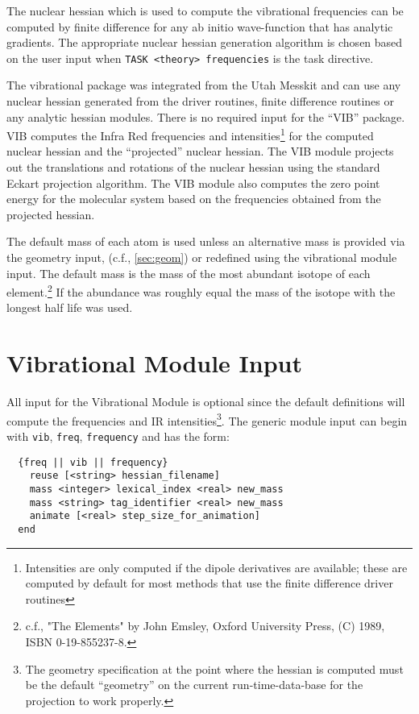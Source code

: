 \label{sec:vib}

The nuclear hessian which is used to compute the vibrational
frequencies can be computed by finite difference for any ab initio
wave-function that has analytic gradients.  The appropriate
nuclear hessian generation algorithm is chosen based on the user input
when \verb+TASK <theory> frequencies+ is the task directive.

The vibrational package was integrated from the Utah Messkit and can
use any nuclear hessian generated from the driver routines, finite
difference routines or any analytic hessian modules.  There is no required
input for the ``VIB'' package.  VIB computes the Infra Red frequencies
and intensities\footnote{Intensities are only computed if the dipole
derivatives are available; these are computed by default for most
methods that use the finite difference driver routines} for the
computed nuclear hessian and the ``projected'' nuclear hessian.  The
VIB module projects out the translations and rotations of the nuclear
hessian using the standard Eckart projection algorithm.  The VIB
module also computes the zero point energy for the molecular system
based on the frequencies obtained from the projected hessian.

The default mass of each atom is used unless an alternative mass is
provided via the geometry input, (c.f., \ref{sec:geom}) or redefined
using the vibrational module input.  The default mass is the mass of
the most abundant isotope of each element.\footnote{c.f., "The
Elements" by John Emsley, Oxford University Press, (C) 1989, ISBN
0-19-855237-8.} If the abundance was roughly equal the mass of the
isotope with the longest half life was used.

\section{Vibrational Module Input}

All input for the Vibrational Module is optional since the default
definitions will compute the frequencies and IR
intensities\footnote{The geometry specification at the point where the
hessian is computed must be the default ``geometry'' on the current
run-time-data-base for the projection to work properly.}.  The generic
module input can begin with \verb+vib+, \verb+freq+, \verb+frequency+
and has the form:
\begin{verbatim}
  {freq || vib || frequency}
    reuse [<string> hessian_filename]
    mass <integer> lexical_index <real> new_mass
    mass <string> tag_identifier <real> new_mass
    animate [<real> step_size_for_animation]     
  end
\end{verbatim}


